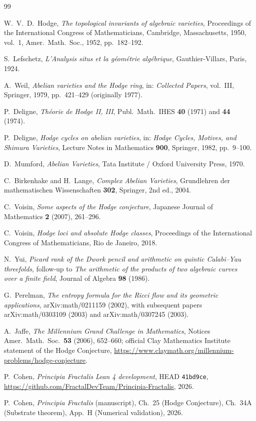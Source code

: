 \documentclass[11pt,a4paper]{article}
\theoremstyle{plain}
\theoremstyle{definition}
\begin{document}
\begin{thebibliography}{99}

W.~V.~D.~Hodge,
\emph{The topological invariants of algebraic varieties},
Proceedings of the International Congress of Mathematicians,
Cambridge, Massachusetts, 1950, vol.~1, Amer.~Math.~Soc., 1952,
pp.~182--192.

S.~Lefschetz,
\emph{L'Analysis situs et la g\'eom\'etrie alg\'ebrique},
Gauthier-Villars, Paris, 1924.

A.~Weil,
\emph{Abelian varieties and the Hodge ring},
in: \emph{Collected Papers}, vol.~III, Springer, 1979, pp.~421--429
(originally 1977).

P.~Deligne,
\emph{Th\'eorie de Hodge II, III},
Publ.\ Math.\ IHES \textbf{40} (1971) and \textbf{44} (1974).

P.~Deligne,
\emph{Hodge cycles on abelian varieties},
in: \emph{Hodge Cycles, Motives, and Shimura Varieties},
Lecture Notes in Mathematics \textbf{900}, Springer, 1982,
pp.~9--100.

D.~Mumford,
\emph{Abelian Varieties},
Tata Institute / Oxford University Press, 1970.

C.~Birkenhake and H.~Lange,
\emph{Complex Abelian Varieties},
Grundlehren der mathematischen Wissenschaften \textbf{302},
Springer, 2nd ed., 2004.

C.~Voisin,
\emph{Some aspects of the Hodge conjecture},
Japanese Journal of Mathematics \textbf{2} (2007), 261--296.

C.~Voisin,
\emph{Hodge loci and absolute Hodge classes},
Proceedings of the International Congress of Mathematicians,
Rio de Janeiro, 2018.

N.~Yui,
\emph{Picard rank of the Dwork pencil and arithmetic on quintic
Calabi--Yau threefolds},
follow-up to \emph{The arithmetic of the products of two algebraic
curves over a finite field}, Journal of Algebra \textbf{98} (1986).

G.~Perelman,
\emph{The entropy formula for the Ricci flow and its geometric
applications}, arXiv:math/0211159 (2002), with subsequent papers
arXiv:math/0303109 (2003) and arXiv:math/0307245 (2003).

A.~Jaffe,
\emph{The Millennium Grand Challenge in Mathematics},
Notices Amer.\ Math.\ Soc.\ \textbf{53} (2006), 652--660; official
Clay Mathematics Institute statement of the Hodge Conjecture,
\url{https://www.claymath.org/millennium-problems/hodge-conjecture}.

P.~Cohen,
\emph{Principia Fractalis Lean 4 development},
HEAD \texttt{41bd9ce},
\url{https://github.com/FractalDevTeam/Principia-Fractalis}, 2026.

P.~Cohen,
\emph{Principia Fractalis} (manuscript), Ch.~25 (Hodge Conjecture),
Ch.~34A (Substrate theorem), App.~H (Numerical validation), 2026.

\end{thebibliography}
\end{document}
